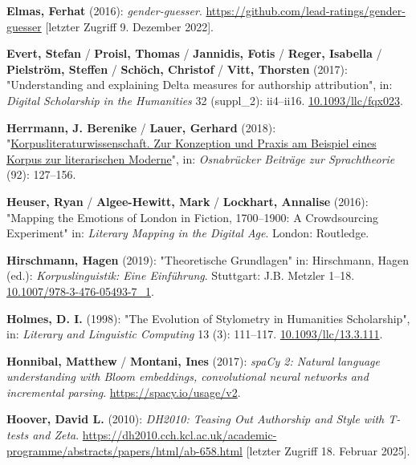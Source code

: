 \documentclass[
  12pt,
  letterpaper,
  DIV=11,
  numbers=noendperiod]{scrreprt}
\newlength{\cslhangindent}
\newenvironment{CSLReferences}[2] %
 {\begin{list}{}{%
  \setlength{\itemindent}{0pt}
  \setlength{\leftmargin}{0pt}
  \setlength{\parsep}{0pt}
  \ifodd #1
   \setlength{\leftmargin}{\cslhangindent}
   \setlength{\itemindent}{-1\cslhangindent}
  \fi
  \setlength{\itemsep}{#2\baselineskip}}}
 {\end{list}}
\begin{document}
\begin{CSLReferences}{1}{0}
\textbf{Elmas, Ferhat} (2016): \emph{gender-guesser}.
\url{https://github.com/lead-ratings/gender-guesser} {[}letzter Zugriff
9. Dezember 2022{]}.

\textbf{Evert, Stefan} / \textbf{Proisl, Thomas} / \textbf{Jannidis,
Fotis} / \textbf{Reger, Isabella} / \textbf{Pielström, Steffen} /
\textbf{Schöch, Christof} / \textbf{Vitt, Thorsten} (2017):
"Understanding and explaining {Delta} measures for authorship
attribution", in: \emph{Digital Scholarship in the Humanities} 32
(suppl\_2): ii4--ii16.
\href{https://doi.org/10.1093/llc/fqx023}{10.1093/llc/fqx023}.

\textbf{Herrmann, J. Berenike} / \textbf{Lauer, Gerhard} (2018):
"\href{https://pub.uni-bielefeld.de/record/2955632}{Korpusliteraturwissenschaft.
{Zur} {Konzeption} und {Praxis} am {Beispiel} eines {Korpus} zur
literarischen {Moderne}}", in: \emph{Osnabrücker Beiträge zur
Sprachtheorie} (92): 127--156.

\textbf{Heuser, Ryan} / \textbf{Algee-Hewitt, Mark} / \textbf{Lockhart,
Annalise} (2016): "Mapping the {Emotions} of {London} in {Fiction},
1700--1900: {A} {Crowdsourcing} {Experiment}" in: \emph{Literary
{Mapping} in the {Digital} {Age}}. London: Routledge.

\textbf{Hirschmann, Hagen} (2019): "Theoretische {Grundlagen}" in:
Hirschmann, Hagen (ed.): \emph{Korpuslinguistik: {Eine} {Einführung}}.
Stuttgart: J.B. Metzler 1--18.
\href{https://doi.org/10.1007/978-3-476-05493-7_1}{10.1007/978-3-476-05493-7\_1}.

\textbf{Holmes, D. I.} (1998): "The {Evolution} of {Stylometry} in
{Humanities} {Scholarship}", in: \emph{Literary and Linguistic
Computing} 13 (3): 111--117.
\href{https://doi.org/10.1093/llc/13.3.111}{10.1093/llc/13.3.111}.

\textbf{Honnibal, Matthew} / \textbf{Montani, Ines} (2017):
\emph{{spaCy} 2: {Natural} language understanding with {Bloom}
embeddings, convolutional neural networks and incremental parsing}.
\url{https://spacy.io/usage/v2}.

\textbf{Hoover, David L.} (2010): \emph{{DH2010}: {Teasing} {Out}
{Authorship} and {Style} with {T}-tests and {Zeta}}.
\url{https://dh2010.cch.kcl.ac.uk/academic-programme/abstracts/papers/html/ab-658.html}
{[}letzter Zugriff 18. Februar 2025{]}.


\end{CSLReferences}
\end{document}
